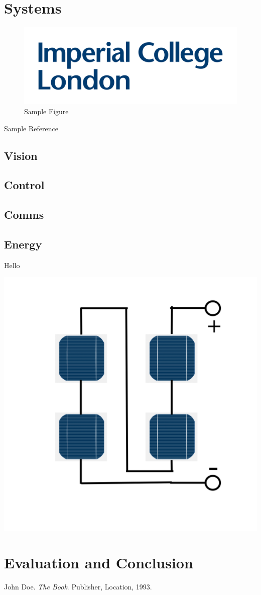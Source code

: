 \documentclass[a4paper, table]{article}
\begin{document}
\section{Systems}

\begin{figure}[H]
\centering
\includegraphics[scale=0.2]{logo.png}
\caption{Sample Figure}
\label{fig:image1}
\end{figure}

Sample Reference\cite{sample}

\subsection{Vision}
\subsection{Control}
\subsection{Comms}


\subsection{Energy}
Hello

\includegraphics[scale=0.3]{Series(S)}


\section{Evaluation and Conclusion}

\newpage

\nocite{*}
\begin{thebibliography}{9}
    John Doe. 
    \textit{The Book}. 
    Publisher, Location, 1993.
\end{thebibliography}
\listoffigures
\end{document}
